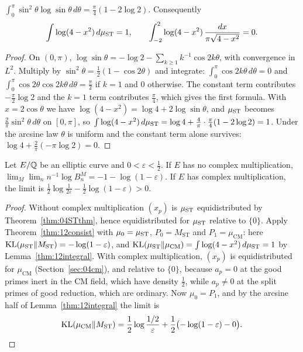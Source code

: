 \begin{lemma}\label{thm:12integral}
$\int_0^\pi\sin^2\theta\log\sin\theta\,d\theta=\frac\pi4(1-2\log2)$. Consequently
\[
\int\log(4-x^2)\,d\mu_{\mathrm{ST}}=1,\qquad \int_{-2}^2\log(4-x^2)\,\frac{dx}{\pi\sqrt{4-x^2}}=0.
\]
\end{lemma}

\begin{proof}
On $(0,\pi)$, $\log\sin\theta=-\log2-\sum_{k\ge1}k^{-1}\cos2k\theta$, with convergence in $L^2$. Multiply by $\sin^2\theta=\frac12(1-\cos2\theta)$ and integrate: $\int_0^\pi\cos2k\theta\,d\theta=0$ and $\int_0^\pi\cos2\theta\cos2k\theta\,d\theta=\frac\pi2$ if $k=1$ and $0$ otherwise. The constant term contributes $-\frac\pi2\log2$ and the $k=1$ term contributes $\frac\pi4$, which gives the first formula. With $x=2\cos\theta$ we have $\log(4-x^2)=\log4+2\log\sin\theta$, and $\mu_{\mathrm{ST}}$ becomes $\frac2\pi\sin^2\theta\,d\theta$ on $[0,\pi]$, so $\int\log(4-x^2)\,d\mu_{\mathrm{ST}}=\log4+\frac4\pi\cdot\frac\pi4(1-2\log2)=1$. Under the arcsine law $\theta$ is uniform and the constant term alone survives: $\log4+\frac2\pi(-\pi\log2)=0$.
\end{proof}

\begin{corollary}\label{thm:12elliptic}
Let $E/\mathbb{Q}$ be an elliptic curve and $0<\varepsilon<\frac12$. If $E$ has no complex multiplication, $\lim_M\lim_n n^{-1}\log B_n^M=-1-\log(1-\varepsilon)$. If $E$ has complex multiplication, the limit is $\frac12\log\frac1{2\varepsilon}-\frac12\log(1-\varepsilon)>0$.
\end{corollary}

\begin{proof}
Without complex multiplication $(x_p)$ is $\mu_{\mathrm{ST}}$ equidistributed by Theorem~\ref{thm:04STthm}, hence equidistributed for $\mu_{\mathrm{ST}}$ relative to $\{0\}$. Apply Theorem~\ref{thm:12consist} with $\mu_0=\mu_{\mathrm{ST}}$, $P_0=M_{\mathrm{ST}}$ and $P_1=\mu_{\mathrm{CM}}$: here $\mathrm{KL}(\mu_{\mathrm{ST}}\|M_{\mathrm{ST}})=-\log(1-\varepsilon)$, and $\mathrm{KL}(\mu_{\mathrm{ST}}\|\mu_{\mathrm{CM}})=\int\log(4-x^2)\,d\mu_{\mathrm{ST}}=1$ by Lemma~\ref{thm:12integral}. With complex multiplication, $(x_p)$ is equidistributed for $\mu_{\mathrm{CM}}$ (Section~\ref{sec:04cm}), and relative to $\{0\}$, because $a_p=0$ at the good primes inert in the CM field, which have density $\frac12$, while $a_p\neq0$ at the split primes of good reduction, which are ordinary. Now $\mu_0=P_1$, and by the arcsine half of Lemma~\ref{thm:12integral} the limit is
\[
\mathrm{KL}(\mu_{\mathrm{CM}}\|M_{\mathrm{ST}})=\frac12\log\frac{1/2}{\varepsilon}+\frac12\bigl(-\log(1-\varepsilon)-0\bigr).\qedhere
\]
\end{proof}

